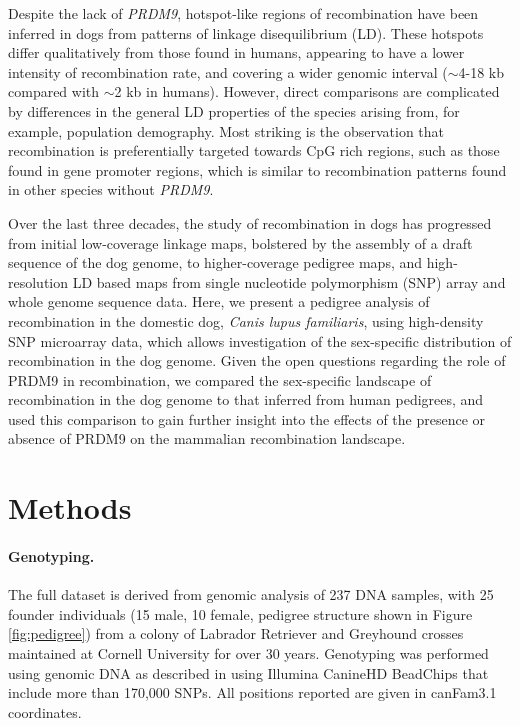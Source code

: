 Despite the lack of \textit{PRDM9}, hotspot-like regions of recombination have been inferred in dogs from patterns of linkage disequilibrium (LD).
These hotspots differ qualitatively from those found in humans, appearing to have a lower intensity of recombination rate, and covering a wider genomic interval ($\sim$4-18 kb compared with $\sim$2 kb in humans)\cite{Axelsson2012,Auton2013}.
However, direct comparisons are complicated by differences in the general LD properties of the species arising from, for example, population demography\cite{Auton2013}.
Most striking is the observation that recombination is preferentially targeted towards CpG rich regions, such as those found in gene promoter regions,
which is similar to recombination patterns found in other species without \textit{PRDM9}.

Over the last three decades, the study of recombination in dogs has progressed from initial low-coverage linkage maps\cite{Mellersh1997,Neff1999}, bolstered by the assembly of a draft sequence of the dog genome\cite{Lindblad-Toh2005}, to higher-coverage pedigree maps\cite{Wong2010}, and high-resolution LD based maps from single nucleotide polymorphism (SNP) array and whole genome sequence data\cite{Axelsson2012,Auton2013}.
Here, we present a pedigree analysis of recombination in the domestic dog, \textit{Canis lupus familiaris}, using high-density SNP microarray data, which allows investigation of the sex-specific distribution of recombination in the dog genome.
Given the open questions regarding the role of PRDM9 in recombination, we compared the sex-specific landscape of recombination in the dog genome to that inferred from human pedigrees, and used this comparison to gain further insight into the effects of the presence or absence of PRDM9 on the mammalian recombination landscape.

\section{Methods}

\paragraph{Genotyping.}
The full dataset is derived from genomic analysis of 237 DNA samples, with 25 founder individuals (15 male, 10 female, pedigree structure shown in Figure \ref{fig:pedigree}) from a colony of Labrador Retriever and Greyhound crosses maintained at Cornell University for over 30 years\cite{Todhunter2003}.
Genotyping was performed using genomic DNA as described in \citet{Hayward2016} using Illumina CanineHD BeadChips that include more than 170,000 SNPs. 
All positions reported are given in canFam3.1 coordinates.

